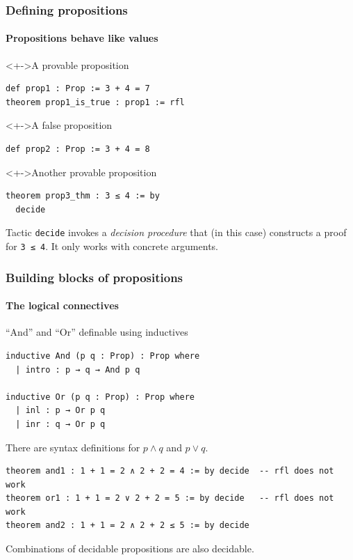 \documentclass{beamer}
\begin{document}
\begin{frame}
  \frametitle{Defining propositions}
  \framesubtitle{Propositions behave like values}
  \begin{block}<+->{A provable proposition}
\begin{lstlisting}
def prop1 : Prop := 3 + 4 = 7
theorem prop1_is_true : prop1 := rfl
\end{lstlisting}
  \end{block}
  \begin{block}<+->{A false proposition}
\begin{lstlisting}
def prop2 : Prop := 3 + 4 = 8
\end{lstlisting}
  \end{block}
  \begin{block}<+->{Another provable proposition}
\begin{lstlisting}
theorem prop3_thm : 3 ≤ 4 := by
  decide
\end{lstlisting}
    Tactic \lstinline{decide} invokes a \emph{decision procedure} that (in this
    case) constructs a proof for \lstinline{3 ≤ 4}. It only works with concrete
    arguments.
  \end{block}
\end{frame}
\begin{frame}
  \frametitle{Building blocks of propositions}
  \framesubtitle{The logical connectives}
  ``And'' and ``Or'' definable using inductives
\begin{lstlisting}
inductive And (p q : Prop) : Prop where
  | intro : p → q → And p q

inductive Or (p q : Prop) : Prop where
  | inl : p → Or p q
  | inr : q → Or p q
\end{lstlisting}
  There are syntax definitions for $p \wedge q$ and $p\vee q$.

\begin{lstlisting}
theorem and1 : 1 + 1 = 2 ∧ 2 + 2 = 4 := by decide  -- rfl does not work
theorem or1 : 1 + 1 = 2 ∨ 2 + 2 = 5 := by decide   -- rfl does not work
theorem and2 : 1 + 1 = 2 ∧ 2 + 2 ≤ 5 := by decide
\end{lstlisting}
Combinations of decidable propositions are also decidable.
\end{frame}
\end{document}
